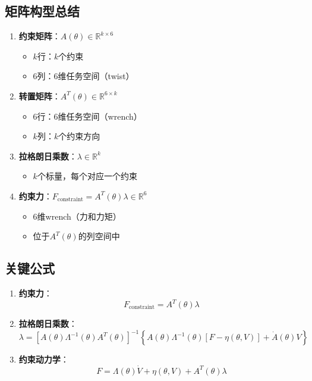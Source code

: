 \documentclass[12pt,a4paper]{article}
\begin{document}
\subsection{矩阵构型总结}

\begin{enumerate}
\item \textbf{约束矩阵}：$A(\theta) \in \mathbb{R}^{k \times 6}$
\begin{itemize}
\item $k$行：$k$个约束
\item $6$列：6维任务空间（twist）
\end{itemize}

\item \textbf{转置矩阵}：$A^T(\theta) \in \mathbb{R}^{6 \times k}$
\begin{itemize}
\item $6$行：6维任务空间（wrench）
\item $k$列：$k$个约束方向
\end{itemize}

\item \textbf{拉格朗日乘数}：$\lambda \in \mathbb{R}^k$
\begin{itemize}
\item $k$个标量，每个对应一个约束
\end{itemize}

\item \textbf{约束力}：$F_{\text{constraint}} = A^T(\theta)\lambda \in \mathbb{R}^6$
\begin{itemize}
\item 6维wrench（力和力矩）
\item 位于$A^T(\theta)$的列空间中
\end{itemize}
\end{enumerate}

\subsection{关键公式}

\begin{enumerate}
\item \textbf{约束力}：
\begin{equation}
F_{\text{constraint}} = A^T(\theta)\lambda
\end{equation}

\item \textbf{拉格朗日乘数}：
\begin{equation}
\lambda = [A(\theta)\Lambda^{-1}(\theta)A^T(\theta)]^{-1}\left\{A(\theta)\Lambda^{-1}(\theta)[F - \eta(\theta, V)] + \dot{A}(\theta)V\right\}
\end{equation}

\item \textbf{约束动力学}：
\begin{equation}
F = \Lambda(\theta)\dot{V} + \eta(\theta, V) + A^T(\theta)\lambda
\end{equation}
\end{enumerate}
\end{document}
